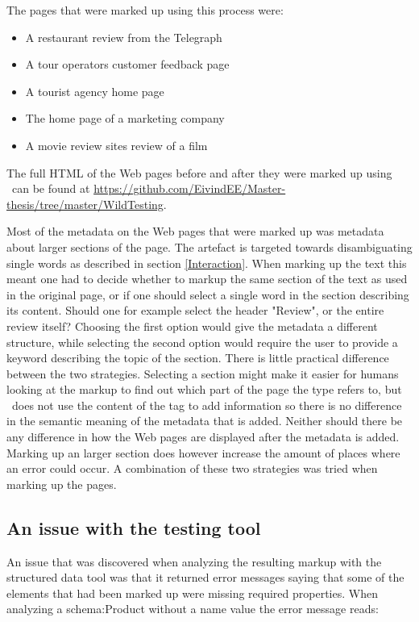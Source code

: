 The pages that were marked up using this process were:
\begin{itemize}
	\item A restaurant review from the Telegraph
	\item A tour operators customer feedback page
	\item A tourist agency home page
	\item The home page of a marketing company
	\item A movie review sites review of a film
\end{itemize}

The full HTML of the Web pages before and after they were marked up using \theartefact\ can be found at
\url{https://github.com/EivindEE/Master-thesis/tree/master/WildTesting}.

Most of the metadata on the Web pages that were marked up was metadata about larger sections of the page.
The artefact is targeted towards disambiguating single words as described in section \ref{Interaction}.
When marking up the text this meant one had to decide whether to markup the same section of the text as used in the original page,
or if one should select a single word in the section describing its content.
Should one for example select the header "Review", or the entire review itself?
Choosing the first option would give the metadata a different structure,
while selecting the second option would require the user to provide a keyword describing the topic of the section.
There is little practical difference between the two strategies.
Selecting a section might make it easier for humans looking at the markup to find out which part of the page the type refers to,
but \theartefact\ does not use the content of the tag to add information so there is no difference in the semantic meaning of the metadata that is added.
Neither should there be any difference in how the Web pages are displayed after the metadata is added.
Marking up an larger section does however increase the amount of places where an error could occur.
A combination of these two strategies was tried when marking up the pages.

\subsection{An issue with the testing tool}
An issue that was discovered when analyzing the resulting markup with the structured data tool was that
it returned  error messages saying that some of the elements that had been marked up were missing required properties.
When analyzing a schema:Product without a name value the error message reads:

